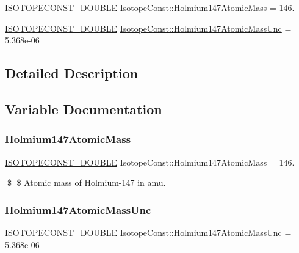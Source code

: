 \begin{DoxyCompactItemize}
\item 
\mbox{\hyperlink{group___isotope_const-_macros_ga8f45a7272ce02c0b4c65c44636ed719a}{I\+S\+O\+T\+O\+P\+E\+C\+O\+N\+S\+T\+\_\+\+D\+O\+U\+B\+LE}} \mbox{\hyperlink{group___isotope_const-_holmium-_ho147_gaaaeda979d87bcc54747b2dce20f6175f}{Isotope\+Const\+::\+Holmium147\+Atomic\+Mass}} = 146.
\item 
\mbox{\hyperlink{group___isotope_const-_macros_ga8f45a7272ce02c0b4c65c44636ed719a}{I\+S\+O\+T\+O\+P\+E\+C\+O\+N\+S\+T\+\_\+\+D\+O\+U\+B\+LE}} \mbox{\hyperlink{group___isotope_const-_holmium-_ho147_gabbe8c6c6ae254dab3ae5d6dcda683bbf}{Isotope\+Const\+::\+Holmium147\+Atomic\+Mass\+Unc}} = 5.\+368e-\/06
\end{DoxyCompactItemize}


\subsection{Detailed Description}


\subsection{Variable Documentation}
\mbox{\label{group___isotope_const-_holmium-_ho147_gaaaeda979d87bcc54747b2dce20f6175f}} 
\subsubsection{\texorpdfstring{Holmium147\+Atomic\+Mass}{Holmium147AtomicMass}}
{\footnotesize\ttfamily \mbox{\hyperlink{group___isotope_const-_macros_ga8f45a7272ce02c0b4c65c44636ed719a}{I\+S\+O\+T\+O\+P\+E\+C\+O\+N\+S\+T\+\_\+\+D\+O\+U\+B\+LE}} Isotope\+Const\+::\+Holmium147\+Atomic\+Mass = 146.}

\$ \$ Atomic mass of Holmium-\/147 in amu. \mbox{\label{group___isotope_const-_holmium-_ho147_gabbe8c6c6ae254dab3ae5d6dcda683bbf}} 
\subsubsection{\texorpdfstring{Holmium147\+Atomic\+Mass\+Unc}{Holmium147AtomicMassUnc}}
{\footnotesize\ttfamily \mbox{\hyperlink{group___isotope_const-_macros_ga8f45a7272ce02c0b4c65c44636ed719a}{I\+S\+O\+T\+O\+P\+E\+C\+O\+N\+S\+T\+\_\+\+D\+O\+U\+B\+LE}} Isotope\+Const\+::\+Holmium147\+Atomic\+Mass\+Unc = 5.\+368e-\/06}

